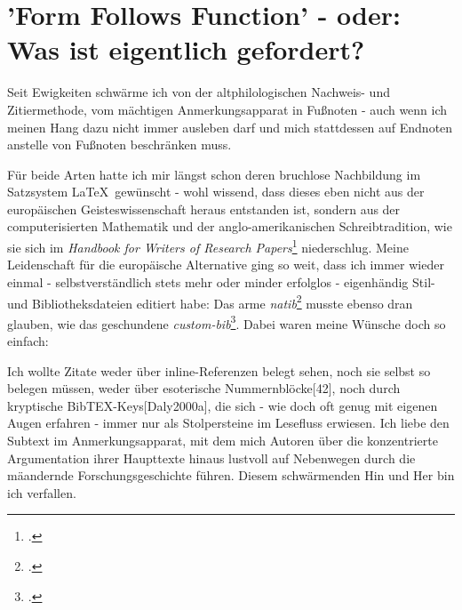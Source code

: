 %
%
%
%
\section{'Form Follows Function' - oder: Was ist eigentlich gefordert?}

Seit Ewigkeiten schwärme ich von der altphilologischen Nachweis- und
Zitiermethode, vom mächtigen Anmerkungsapparat in Fußnoten - auch wenn ich
meinen Hang dazu nicht immer ausleben darf und mich stattdessen auf Endnoten
anstelle von Fußnoten beschränken muss.

Für beide Arten hatte ich mir längst schon deren bruchlose Nachbildung im
Satzsystem \LaTeX\ gewünscht - wohl wissend, dass dieses eben nicht aus der
europäischen Geisteswissenschaft heraus entstanden ist, sondern aus der
computerisierten Mathematik und der anglo-amerikanischen Schreibtradition, wie
sie sich im \textit{Handbook for Writers of Research
Papers}\footcite[vgl.][]{ModLanAss2009a} niederschlug. Meine Leidenschaft für
die europäische Alternative ging so weit, dass ich immer wieder einmal -
selbstverständlich stets mehr oder minder erfolglos - eigenhändig Stil- und
Bibliotheksdateien editiert habe: Das arme
\emph{natib}\footcite[vgl.][]{Daly2000a} musste ebenso dran glauben, wie das
geschundene \emph{custom-bib}\footcite[vgl.][]{Daly2007a}. Dabei waren meine
Wünsche doch so einfach:

Ich wollte Zitate weder über inline-Referenzen belegt sehen, noch sie selbst so
belegen müssen, weder über esoterische Nummernblöcke[42], noch durch kryptische
BibTEX-Keys[Daly2000a], die sich - wie doch oft genug mit eigenen Augen erfahren
- immer nur als Stolpersteine im Lesefluss erwiesen. Ich liebe den Subtext im
Anmerkungsapparat, mit dem mich Autoren über die konzentrierte Argumentation
ihrer Haupttexte hinaus lustvoll auf Nebenwegen durch die mäandernde
Forschungsgeschichte führen. Diesem schwärmenden Hin und Her bin ich verfallen.


